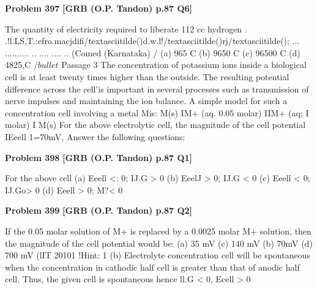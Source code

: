 \begin{problembox}
\textbf{Problem 397} \hfill \textbf{[GRB (O.P. Tandon) p.87 Q6]}
\label{q:ext-grb_all_questions-397}

The quantity of electricity required to liberate 112 cc hydrogen 
. .!l.LS,T.:efro.macjdifi/textasciitilde()d\underline{\hspace{1cm}}.w.l!/textasciitilde()rj/textasciitilde(); ... \underline{\hspace{1cm}} .......... \underline{\hspace{1cm}} .. \underline{\hspace{1cm}} .... \underline{\hspace{1cm}} .... \underline{\hspace{1cm}} .. \underline{\hspace{1cm}} \underline{\hspace{1cm}} 
(Comed (Karnataka) /%
(a) 965 C 
(b) 9650 C 
(c) 96500 C 
(d) 4825,C 
$/bullet$ Passage 3 
The concentration of potassium ions inside a biological cell is at 
least twenty times higher than the outside. The resulting potential 
difference across the cell'is important in several processes such as 
transmission of nerve impulses and maintaining the ion balance. A 
simple model for such a concentration cell involving a metal Mis: 
M(s) IM+ (aq. 0.05 molar) IIM+ (aq; I molar) I M(s) 
For the above electrolytic cell, the magnitude of the cell potential 
IEeell 1=70mV, 
Answer the following questions:
\end{problembox}

\begin{problembox}
\textbf{Problem 398} \hfill \textbf{[GRB (O.P. Tandon) p.87 Q1]}
\label{q:ext-grb_all_questions-398}

For the above cell 
(a) Eeell <: 0; IJ.G > 0 
(b) EeelJ > 0; IJ.G < 0 
(c) Eeell < 0; IJ.Go> 0 
(d) Eeell > 0; M?< 0
\end{problembox}

\begin{problembox}
\textbf{Problem 399} \hfill \textbf{[GRB (O.P. Tandon) p.87 Q2]}
\label{q:ext-grb_all_questions-399}

If the 0.05 molar solution of M+ is replaced by a 0.0025 molar 
M+ solution, then the magnitude of the cell potential would 
be: 
(a) 35 mV 
(c) 140 mV 
(b) 70mV 
(d) 700 mV 
(lIT 20101 
!Hint: 
1 (b) Electrolyte concentration cell will be spontaneous 
when the concentration in cathodic half cell is greater than that of 
anodic half cell. Thus, the given cell is spontaneous hence 
ll.G < 0, Ecell > 0
\end{problembox}

